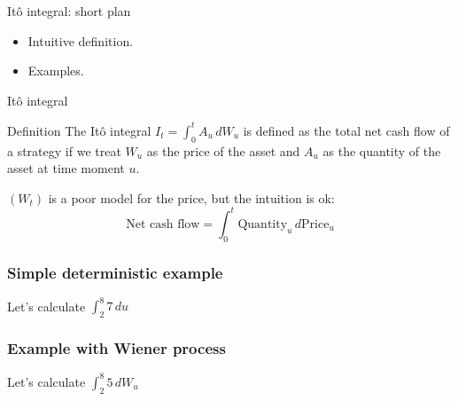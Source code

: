 
\begin{frame} %


\end{frame}


\begin{frame}{Itô integral: short plan}

  \begin{itemize}[<+->]
    \item Intuitive definition.
    \item Examples.
  \end{itemize}

\end{frame}


\begin{frame}{Itô integral}

  \begin{block}{Definition\informalduck}
    The Itô integral $I_t = \int_0^t A_u \, dW_u$ is defined as the \alert{total net cash flow} of a strategy if we treat 
    $W_u$ as the price of the asset and $A_u$ as the quantity of the asset at time moment $u$. 
\end{block}

\pause 
$(W_t)$ is a poor model for the price, but the intuition is ok:
\pause
\[
\text{Net cash flow} = \int_0^t \text{Quantity}_u \, d\text{Price}_u  
\]
\end{frame}

\begin{frame}
  \frametitle{Simple deterministic example}
  
  Let's calculate $\int_2^8 7 \, du$\knightduck






\end{frame}


\begin{frame}
  \frametitle{Example with Wiener process}
  
  Let's calculate $\int_2^8 5 \, dW_u$\knightduck






\end{frame}

